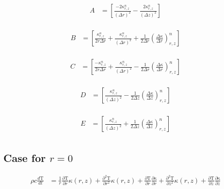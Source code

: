 \documentclass[12pt]{article}
\begin{document}
		
		\begin{equation}
		\begin{aligned}
		A &= \left [\frac{-2\kappa^n_{r, z}}{(\Delta r)^2} -\frac{2\kappa^n_{r, z}}{(\Delta z)^2}  \right ] \\
		\end{aligned}
		\end{equation}
		
		\begin{equation}
		\begin{aligned}
		B &= \left [\frac{\kappa^n_{r, z}}{2r\Delta r} + \frac{\kappa^n_{r, z}}{(\Delta r)^2} + \frac{1}{2\Delta r}(\frac{\Delta\kappa}{\Delta r})^n_{r, z} \right ] \\
		\end{aligned}
		\end{equation}
		
		\begin{equation}
		\begin{aligned}
		C &= \left [\frac{-\kappa^n_{r, z}}{2r\Delta r} + \frac{\kappa^n_{r, z}}{(\Delta r)^2} - \frac{1}{2\Delta r}(\frac{\Delta\kappa}{\Delta r})^n_{r, z} \right ] \\
		\end{aligned}
		\end{equation}
		
		\begin{equation}
		\begin{aligned}
		D &= \left [\frac{\kappa^n_{r, z}}{(\Delta z)^2} - \frac{1}{2\Delta z}(\frac{\Delta\kappa}{\Delta z})^n_{r, z}  \right ] \\
		\end{aligned}
		\end{equation}
		
		\begin{equation}
		\begin{aligned}
		E &= \left [ \frac{\kappa^n_{r, z}}{(\Delta z)^2} + \frac{1}{2\Delta z}(\frac{\Delta\kappa}{\Delta z})^n_{r, z} \right ] \\
		\end{aligned}
		\end{equation}

    \subsection{Case for $r=0$}
      \begin{equation}
        \begin{aligned}
          \rho c \frac{d\mathrm{T}}{dt} &= \frac{1}{r} \frac{\partial\mathrm{T}}{\partial r}\kappa(r, z) + \frac{\partial^2\mathrm{T}}{\partial r^2}\kappa(r, z)  + \frac{\partial\mathrm{T}}{\partial r} \frac{\partial\mathrm{\kappa}}{\partial r}  + \frac{\partial^2\mathrm{T}}{\partial z^2}\kappa(r, z) + \frac{\partial\mathrm{T}}{\partial z}\frac{\partial\mathrm{\kappa}}{\partial z} \\
        \end{aligned}
      \end{equation}	
\end{document}
